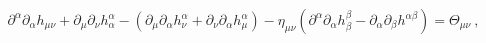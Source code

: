 \begin{equation}
\partial ^{\alpha }\partial _{\alpha }h_{\mu \nu }+\partial _{\mu }\partial
_{\nu }h_{\alpha }^{\alpha }-\left( \partial _{\mu }\partial _{\alpha
}h_{\nu }^{\alpha }+\partial _{\nu }\partial _{\alpha }h_{\mu }^{\alpha
}\right) -\eta _{\mu \nu }\left( \partial ^{\alpha }\partial _{\alpha
}h_{\beta }^{\beta }-\partial _{\alpha }\partial _{\beta }h^{\alpha \beta
}\right) =\Theta _{\mu \nu }\ ,  \label{ei}
\end{equation}%
